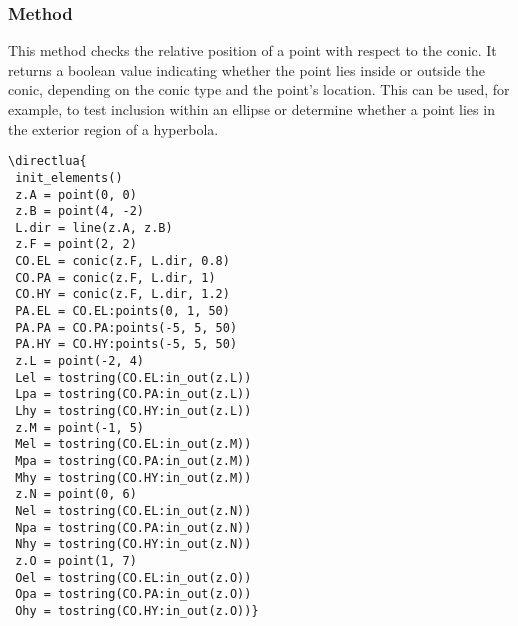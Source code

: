 \subsubsection{Method }
\label{ssub:method_conic_in_out}

This method checks the relative position of a point with respect to the conic.
It returns a boolean value indicating whether the point lies inside or outside the conic, depending on the conic type and the point's location.
This can be used, for example, to test inclusion within an ellipse or determine whether a point lies in the exterior region of a hyperbola.

\vspace{1em}

\begin{minipage}{.5\textwidth}
\begin{verbatim}
\directlua{
 init_elements()
 z.A = point(0, 0)
 z.B = point(4, -2)
 L.dir = line(z.A, z.B)
 z.F = point(2, 2)
 CO.EL = conic(z.F, L.dir, 0.8)
 CO.PA = conic(z.F, L.dir, 1)
 CO.HY = conic(z.F, L.dir, 1.2)
 PA.EL = CO.EL:points(0, 1, 50)
 PA.PA = CO.PA:points(-5, 5, 50)
 PA.HY = CO.HY:points(-5, 5, 50)
 z.L = point(-2, 4)
 Lel = tostring(CO.EL:in_out(z.L))
 Lpa = tostring(CO.PA:in_out(z.L))
 Lhy = tostring(CO.HY:in_out(z.L))
 z.M = point(-1, 5)
 Mel = tostring(CO.EL:in_out(z.M))
 Mpa = tostring(CO.PA:in_out(z.M))
 Mhy = tostring(CO.HY:in_out(z.M))
 z.N = point(0, 6)
 Nel = tostring(CO.EL:in_out(z.N))
 Npa = tostring(CO.PA:in_out(z.N))
 Nhy = tostring(CO.HY:in_out(z.N))
 z.O = point(1, 7)
 Oel = tostring(CO.EL:in_out(z.O))
 Opa = tostring(CO.PA:in_out(z.O))
 Ohy = tostring(CO.HY:in_out(z.O))}
\end{verbatim}
\end{minipage}
